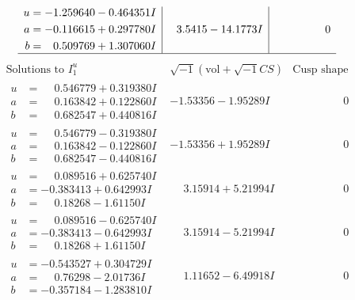 \documentclass[1p]{elsarticle_modified}
\theoremstyle{definition}
\newcommand{\I}{\sqrt{-1}}
\begin{document}
$$\begin{array}{c|c|c}
\begin{aligned}
u &= -1.259640 - 0.464351 I \\
a &= -0.116615 + 0.297780 I \\
b &= \phantom{-}0.509769 + 1.307060 I\end{aligned}
 & \phantom{-}3.5415 - 14.1773 I & \phantom{-0.000000 } 0\\
 \hline 
 \end{array}$$\newpage$$\begin{array}{c|c|c}  
\text{Solutions to }I^u_{1}& \I (\text{vol} + \sqrt{-1}CS) & \text{Cusp shape}\\
 \hline 
\begin{aligned}
u &= \phantom{-}0.546779 + 0.319380 I \\
a &= \phantom{-}0.163842 + 0.122860 I \\
b &= \phantom{-}0.682547 + 0.440816 I\end{aligned}
 & -1.53356 - 1.95289 I & \phantom{-0.000000 } 0 \\ \hline\begin{aligned}
u &= \phantom{-}0.546779 - 0.319380 I \\
a &= \phantom{-}0.163842 - 0.122860 I \\
b &= \phantom{-}0.682547 - 0.440816 I\end{aligned}
 & -1.53356 + 1.95289 I & \phantom{-0.000000 } 0 \\ \hline\begin{aligned}
u &= \phantom{-}0.089516 + 0.625740 I \\
a &= -0.383413 + 0.642993 I \\
b &= \phantom{-}0.18268 - 1.61150 I\end{aligned}
 & \phantom{-}3.15914 + 5.21994 I & \phantom{-0.000000 } 0 \\ \hline\begin{aligned}
u &= \phantom{-}0.089516 - 0.625740 I \\
a &= -0.383413 - 0.642993 I \\
b &= \phantom{-}0.18268 + 1.61150 I\end{aligned}
 & \phantom{-}3.15914 - 5.21994 I & \phantom{-0.000000 } 0 \\ \hline\begin{aligned}
u &= -0.543527 + 0.304729 I \\
a &= \phantom{-}0.76298 - 2.01736 I \\
b &= -0.357184 - 1.283810 I\end{aligned}
 & \phantom{-}1.11652 - 6.49918 I & \phantom{-0.000000 } 0 \\ \hline\begin{aligned}

\end{aligned}
\end{array}$$
\end{document}
